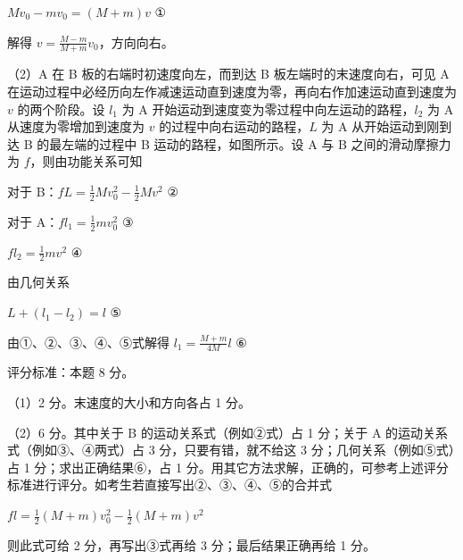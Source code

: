 \documentclass[\gkver]{gaokaozhenti}
\begin{document}
\begin{enumerate}
{$Mv_{0}-mv_{0}=(M+m)v$ ①

解得 $v=\frac{M-m}{M+m}v_{0}$，方向向右。

（2）A 在 B 板的右端时初速度向左，而到达 B 板左端时的末速度向右，可见 A 在运动过程中必经历向左作减速运动直到速度为零，再向右作加速运动直到速度为 $v$ 的两个阶段。设 $l_{1}$ 为 A 开始运动到速度变为零过程中向左运动的路程，$l_{2}$ 为 A 从速度为零增加到速度为 $v$ 的过程中向右运动的路程，$L$ 为 A 从开始运动到刚到达 B 的最左端的过程中 B 运动的路程，如图所示。设 A 与 B 之间的滑动摩擦力为 $f$，则由功能关系可知

对于 B：$fL=\frac{1}{2}Mv_{0}^{2}-\frac{1}{2}Mv^{2}$ ②

对于 A：$fl_{1}=\frac{1}{2}mv_{0}^{2}$ ③

$fl_{2}=\frac{1}{2}mv^{2}$ ④

由几何关系

$L+(l_{1}-l_{2})=l$ ⑤

由①、②、③、④、⑤式解得 $l_{1}=\frac{M+m}{4M}l$ ⑥


评分标准：本题 8 分。

（1）2 分。末速度的大小和方向各占 1 分。

（2）6 分。其中关于 B 的运动关系式（例如②式）占 1 分；关于 A 的运动关系式（例如③、④两式）占 3 分，只要有错，就不给这 3 分；几何关系（例如⑤式）占 1 分；求出正确结果⑥，占 1 分。用其它方法求解，正确的，可参考上述评分标准进行评分。如考生若直接写出②、③、④、⑤的合并式

$fl=\frac{1}{2}(M+m)v_{0}^{2}-\frac{1}{2}(M+m)v^{2}$

则此式可给 2 分，再写出③式再给 3 分；最后结果正确再给 1 分。
}

\end{enumerate}
\end{document}
